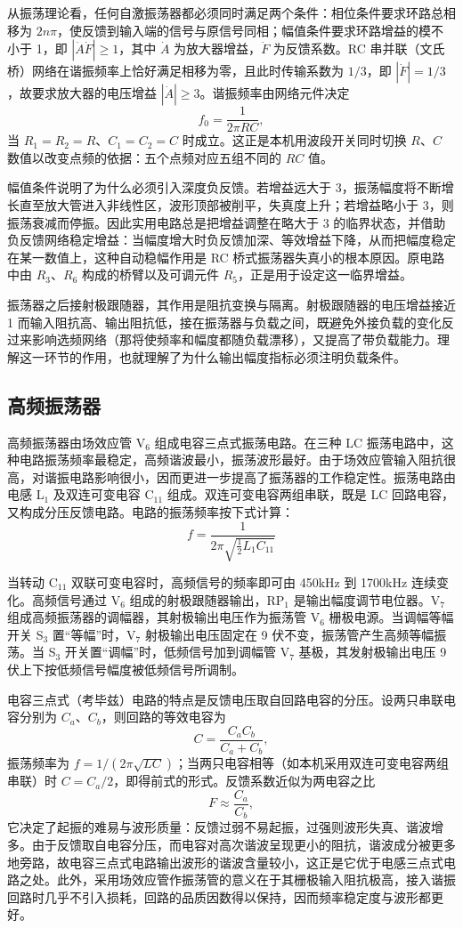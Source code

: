 \documentclass[12pt,UTF8]{ctexbook}
\begin{document}
	从振荡理论看，任何自激振荡器都必须同时满足两个条件：相位条件要求环路总相移为 $2n\pi$，使反馈到输入端的信号与原信号同相；幅值条件要求环路增益的模不小于 1，即 $|\dot{A}\dot{F}| \ge 1$，其中 $\dot{A}$ 为放大器增益，$\dot{F}$ 为反馈系数。RC 串并联（文氏桥）网络在谐振频率上恰好满足相移为零，且此时传输系数为 $1/3$，即 $|\dot{F}| = 1/3$，故要求放大器的电压增益 $|\dot{A}| \ge 3$。谐振频率由网络元件决定
	\[
	f_0 = \frac{1}{2\pi R C},
	\]
	当 $R_1 = R_2 = R$、$C_1 = C_2 = C$ 时成立。这正是本机用波段开关同时切换 $R$、$C$ 数值以改变点频的依据：五个点频对应五组不同的 $RC$ 值。
	
	幅值条件说明了为什么必须引入深度负反馈。若增益远大于 3，振荡幅度将不断增长直至放大管进入非线性区，波形顶部被削平，失真度上升；若增益略小于 3，则振荡衰减而停振。因此实用电路总是把增益调整在略大于 3 的临界状态，并借助负反馈网络稳定增益：当幅度增大时负反馈加深、等效增益下降，从而把幅度稳定在某一数值上，这种自动稳幅作用是 RC 桥式振荡器失真小的根本原因。原电路中由 $R_3$、$R_6$ 构成的桥臂以及可调元件 $R_5$，正是用于设定这一临界增益。
	
	振荡器之后接射极跟随器，其作用是阻抗变换与隔离。射极跟随器的电压增益接近 1 而输入阻抗高、输出阻抗低，接在振荡器与负载之间，既避免外接负载的变化反过来影响选频网络（那将使频率和幅度都随负载漂移），又提高了带负载能力。理解这一环节的作用，也就理解了为什么输出幅度指标必须注明负载条件。
	
	\subsection{高频振荡器}
	高频振荡器由场效应管 V\(_6\) 组成电容三点式振荡电路。在三种 LC 振荡电路中，这种电路振荡频率最稳定，高频谐波最小，振荡波形最好。由于场效应管输入阻抗很高，对谐振电路影响很小，因而更进一步提高了振荡器的工作稳定性。振荡电路由电感 L\(_1\) 及双连可变电容 C\(_{11}\) 组成。双连可变电容两组串联，既是 LC 回路电容，又构成分压反馈电路。电路的振荡频率按下式计算：
	\[
	f = \frac{1}{2\pi \sqrt{\frac{1}{2} L_1 C_{11}}}
	\]
	
	当转动 C\(_{11}\) 双联可变电容时，高频信号的频率即可由 450kHz 到 1700kHz 连续变化。高频信号通过 V\(_6\) 组成的射极跟随器输出，RP\(_1\) 是输出幅度调节电位器。V\(_7\) 组成高频振荡器的调幅器，其射极输出电压作为振荡管 V\(_6\) 栅极电源。当调幅等幅开关 S\(_3\) 置“等幅”时，V\(_7\) 射极输出电压固定在 9 伏不变，振荡管产生高频等幅振荡。当 S\(_3\) 开关置“调幅”时，低频信号加到调幅管 V\(_7\) 基极，其发射极输出电压 9 伏上下按低频信号幅度被低频信号所调制。
	
	电容三点式（考毕兹）电路的特点是反馈电压取自回路电容的分压。设两只串联电容分别为 $C_a$、$C_b$，则回路的等效电容为
	\[
	C = \frac{C_a C_b}{C_a + C_b},
	\]
	振荡频率为 $f = 1/(2\pi\sqrt{L C})$；当两只电容相等（如本机采用双连可变电容两组串联）时 $C = C_a/2$，即得前式的形式。反馈系数近似为两电容之比
	\[
	F \approx \frac{C_a}{C_b},
	\]
	它决定了起振的难易与波形质量：反馈过弱不易起振，过强则波形失真、谐波增多。由于反馈取自电容分压，而电容对高次谐波呈现更小的阻抗，谐波成分被更多地旁路，故电容三点式电路输出波形的谐波含量较小，这正是它优于电感三点式电路之处。此外，采用场效应管作振荡管的意义在于其栅极输入阻抗极高，接入谐振回路时几乎不引入损耗，回路的品质因数得以保持，因而频率稳定度与波形都更好。
	
\end{document}
